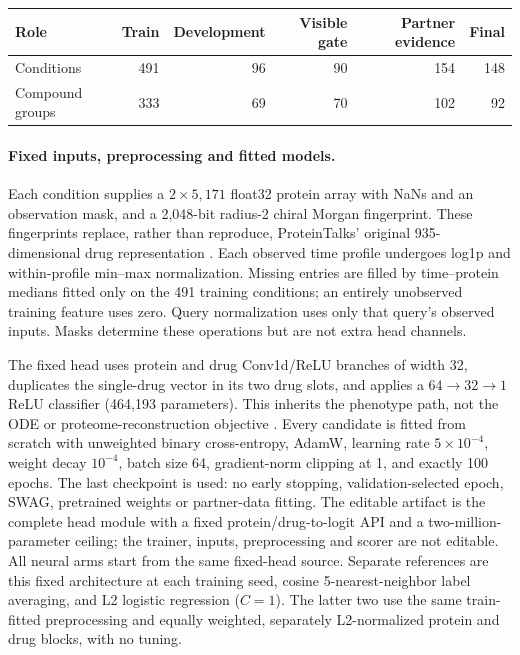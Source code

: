 \begin{center}\small
\begin{tabular}{lrrrrr}
\toprule
Role & Train & Development & Visible gate & Partner evidence & Final \\
\midrule
Conditions & 491 & 96 & 90 & 154 & 148 \\
Compound groups & 333 & 69 & 70 & 102 & 92 \\
\bottomrule
\end{tabular}
\end{center}

\paragraph{Fixed inputs, preprocessing and fitted models.}
Each condition supplies a $2\times5{,}171$ float32 protein array with NaNs and
an observation mask, and a 2,048-bit radius-2 chiral Morgan fingerprint.
These fingerprints replace, rather than reproduce, ProteinTalks' original
935-dimensional drug representation \citep{Sun2026ProteinTalks}.
Each observed time profile undergoes log1p and within-profile min--max
normalization. Missing entries are filled by time--protein medians fitted
only on the 491 training conditions; an entirely unobserved training feature
uses zero. Query normalization uses only that query's observed inputs.
Masks determine these operations but are not extra head channels.

The fixed head uses protein and drug Conv1d/ReLU branches of width 32,
duplicates the single-drug vector in its two drug slots, and applies
a $64\!\rightarrow\!32\!\rightarrow\!1$ ReLU classifier
(464,193 parameters). This inherits the phenotype path, not the ODE or
proteome-reconstruction objective \citep{Sun2026ProteinTalks}.
Every candidate is fitted from scratch with unweighted binary
cross-entropy, AdamW, learning rate $5\times10^{-4}$, weight decay $10^{-4}$,
batch size 64, gradient-norm clipping at 1, and exactly 100 epochs.
The last checkpoint is used: no early stopping, validation-selected epoch,
SWAG, pretrained weights or partner-data fitting. The editable artifact is
the complete head module with a fixed protein/drug-to-logit API and a
two-million-parameter ceiling; the trainer, inputs, preprocessing and scorer
are not editable. All neural arms start from the same fixed-head source.
Separate references are this fixed architecture at each training seed,
cosine 5-nearest-neighbor label averaging, and L2 logistic regression
($C=1$). The latter two use the same train-fitted preprocessing and equally
weighted, separately L2-normalized protein and drug blocks, with no tuning.

